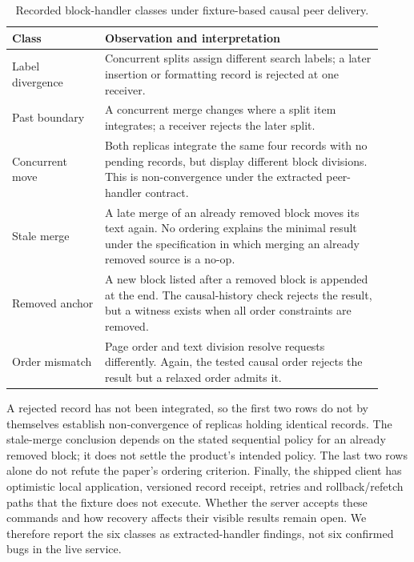 \begin{table}[t]
\centering
\small
\caption{Recorded block-handler classes under fixture-based causal peer delivery.}
\label{tab:notion-handler-inventory}
\begin{tabular}{p{0.23\linewidth}p{0.69\linewidth}}
\hline
Class & Observation and interpretation \\
\hline
Label divergence & Concurrent splits assign different search labels;
a later insertion or formatting record is rejected at one receiver. \\
Past boundary & A concurrent merge changes where a split item integrates;
a receiver rejects the later split. \\
Concurrent move & Both replicas integrate the same four records with no
pending records, but display different block divisions. This is
non-convergence under the extracted peer-handler contract. \\
Stale merge & A late merge of an already removed block moves its text
again. No ordering explains the minimal result under the specification
in which merging an already removed source is a no-op. \\
Removed anchor & A new block listed after a removed block is appended
at the end. The causal-history check rejects the result, but a witness
exists when all order constraints are removed. \\
Order mismatch & Page order and text division resolve requests differently.
Again, the tested causal order rejects the result but a relaxed order admits it. \\
\hline
\end{tabular}
\end{table}

A rejected record has not been integrated, so the first two rows do not by
themselves establish non-convergence of replicas holding identical records.
The stale-merge conclusion depends on the stated sequential policy for an
already removed block; it does not settle the product's intended policy.
The last two rows alone do not refute the paper's ordering criterion.
Finally, the shipped client has optimistic local application, versioned
record receipt, retries and rollback/refetch paths that the fixture does not
execute. Whether the server accepts these commands and how recovery affects
their visible results remain open. We therefore report the six classes as
extracted-handler findings, not six confirmed bugs in the live service.
